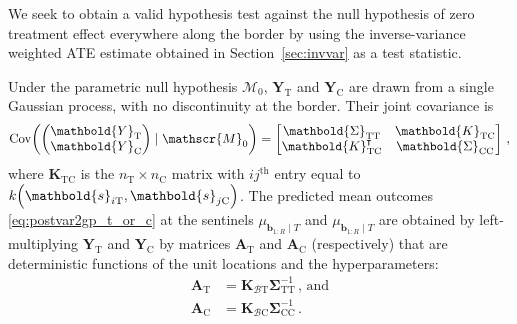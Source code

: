 \documentclass[letter,12pt]{article}
\DeclarePairedDelimiter{\parenthesis}{\lparen}{\rparen}
\newcommand{\del}[1]{\parenthesis*{#1}}
\DeclareMathOperator{\cov}{{Cov}}
\newcommand*{\trans}{^{\mkern-1.5mu\intercal}}
\newcommand{\treat}{\mathrm{T}}
\newcommand{\ctrol}{\mathrm{C}}
\newcommand{\svec}{\mathbold{s}}
\newcommand{\Yvec}{\mathbold{Y}}
\newcommand{\yt}{\Yvec_{\treat}}
\newcommand{\yc}{\Yvec_{\ctrol}}
\newcommand{\border}{\mathcal{B}}
\newcommand{\sentinel}{\bm{b}}
\newcommand{\numsent}{R}
\newcommand{\sentinels}{\sentinel_{1:\numsent}}
\newcommand{\modnull}{\mathscr{M}_0}
\newcommand{\Kmat}{\mathbold{K}}
\newcommand{\Amat}{\mathbold{A}}
\newcommand{\SigmaMat}{\mathbold{\Sigma}}
\newcommand{\KBT}{\Kmat_{\border \treat}}
\newcommand{\KBC}{\Kmat_{\border \ctrol}}
\newcommand{\STT}{\SigmaMat_{\treat \treat}}
\newcommand{\SCC}{\SigmaMat_{\ctrol \ctrol}}
\newcommand{\KTC}{\Kmat_{\treat \ctrol}}
\newcommand{\AT}{\Amat_{\treat}}
\newcommand{\AC}{\Amat_{\ctrol}}
\begin{document}
\label{sec:calibration}



We seek to obtain a valid hypothesis test against the null hypothesis of zero treatment effect everywhere along the border by using the inverse-variance weighted ATE estimate obtained in Section~\ref{sec:invvar} as a test statistic.



Under the parametric null hypothesis \(\modnull\), \(\yt{}\) and \(\yc{}\) are drawn from a single Gaussian process, with no discontinuity at the border.
Their joint covariance is
\begin{equation}
\cov \del{\begin{pmatrix}\yt{} \\ \yc{}\end{pmatrix} \mid \modnull } 
    = \begin{bmatrix}
        \STT & \KTC \\
        \KTC \trans & \SCC
    \end{bmatrix}\,,
\end{equation}
where \(\KTC\) is the \(n_\treat \times n_\ctrol\) matrix with \(ij^{\mathrm{th}}\) entry equal to \(k\del{\svec_{i\treat},\svec_{j\ctrol}}\).
The predicted mean outcomes \eqref{eq:postvar2gp_t_or_c} at the sentinels \(\mu_{\sentinels \mid T}\) and \(\mu_{\sentinels \mid T}\) are obtained by left-multiplying \(\yt{}\) and \(\yc{}\) by matrices \(\AT{}\) and \(\AC{}\) (respectively) that are deterministic functions of the unit locations and the hyperparameters:
\begin{equation}
    \begin{split}
        \AT &= \KBT \STT^{-1} \,\text{, and} \\
        \AC &= \KBC \SCC^{-1}\,.
    \end{split}
\end{equation}
\end{document}
